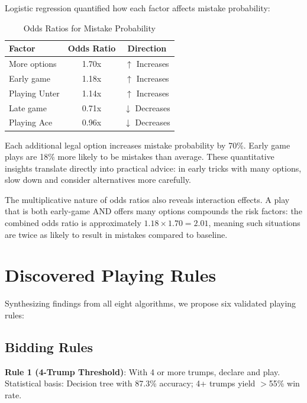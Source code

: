\documentclass[conference]{IEEEtran}
\begin{document}
Logistic regression quantified how each factor affects mistake probability:

\begin{table}[htbp]
\caption{Odds Ratios for Mistake Probability}
\begin{center}
\begin{tabular}{lcc}
\toprule
\textbf{Factor} & \textbf{Odds Ratio} & \textbf{Direction} \\
\midrule
More options & 1.70x & $\uparrow$ Increases \\
Early game & 1.18x & $\uparrow$ Increases \\
Playing Unter & 1.14x & $\uparrow$ Increases \\
Late game & 0.71x & $\downarrow$ Decreases \\
Playing Ace & 0.96x & $\downarrow$ Decreases \\
\bottomrule
\end{tabular}
\label{tab:odds_ratios}
\end{center}
\end{table}

Each additional legal option increases mistake probability by 70\%. Early game plays are 18\% more likely to be mistakes than average. These quantitative insights translate directly into practical advice: in early tricks with many options, slow down and consider alternatives more carefully.

The multiplicative nature of odds ratios also reveals interaction effects. A play that is both early-game AND offers many options compounds the risk factors: the combined odds ratio is approximately $1.18 \times 1.70 = 2.01$, meaning such situations are twice as likely to result in mistakes compared to baseline.

\section{Discovered Playing Rules}

Synthesizing findings from all eight algorithms, we propose six validated playing rules:

\subsection{Bidding Rules}

\textbf{Rule 1 (4-Trump Threshold)}: With 4 or more trumps, declare and play. Statistical basis: Decision tree with 87.3\% accuracy; 4+ trumps yield $>$55\% win rate.
\end{document}
